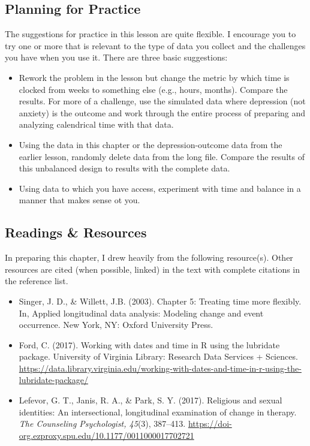 \documentclass[
  english,
]{book}
\providecommand{\tightlist}{%
  \setlength{\itemsep}{0pt}\setlength{\parskip}{0pt}}
\begin{document}
\hypertarget{planning-for-practice-3}{%
\subsection{Planning for Practice}\label{planning-for-practice-3}}

The suggestions for practice in this lesson are quite flexible. I encourage you to try one or more that is relevant to the type of data you collect and the challenges you have when you use it. There are three basic suggestions:

\begin{itemize}
\tightlist
\item
  Rework the problem in the lesson but change the metric by which time is clocked from weeks to something else (e.g., hours, months). Compare the results. For more of a challenge, use the simulated data where depression (not anxiety) is the outcome and work through the entire process of preparing and analyzing calendrical time with that data.
\item
  Using the data in this chapter or the depression-outcome data from the earlier lesson, randomly delete data from the long file. Compare the results of this unbalanced design to results with the complete data.
\item
  Using data to which you have access, experiment with time and balance in a manner that makes sense ot you.
\end{itemize}

\hypertarget{readings-resources-3}{%
\subsection{Readings \& Resources}\label{readings-resources-3}}

In preparing this chapter, I drew heavily from the following resource(s). Other resources are cited (when possible, linked) in the text with complete citations in the reference list.

\begin{itemize}
\tightlist
\item
  Singer, J. D., \& Willett, J.B. (2003). Chapter 5: Treating time more flexibly. In, Applied longitudinal data analysis: Modeling change and event occurrence. New York, NY: Oxford University Press.
\item
  Ford, C. (2017). Working with dates and time in R using the lubridate package. University of Virginia Library: Research Data Services + Sciences. \url{https://data.library.virginia.edu/working-with-dates-and-time-in-r-using-the-lubridate-package/}
\item
  Lefevor, G. T., Janis, R. A., \& Park, S. Y. (2017). Religious and sexual identities: An intersectional, longitudinal examination of change in therapy. \emph{The Counseling Psychologist, 45}(3), 387--413. \url{https://doi-org.ezproxy.spu.edu/10.1177/0011000017702721}
\end{itemize}
\end{document}
